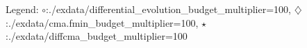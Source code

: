 Legend: {\color{NavyBlue}$\circ$}:./exdata/differential\_evolution\_budget\_multiplier=100, {\color{Magenta}$\diamondsuit$}:./exdata/cma.fmin\_budget\_multiplier=100, {\color{Orange}$\star$}:./exdata/diffcma\_budget\_multiplier=100